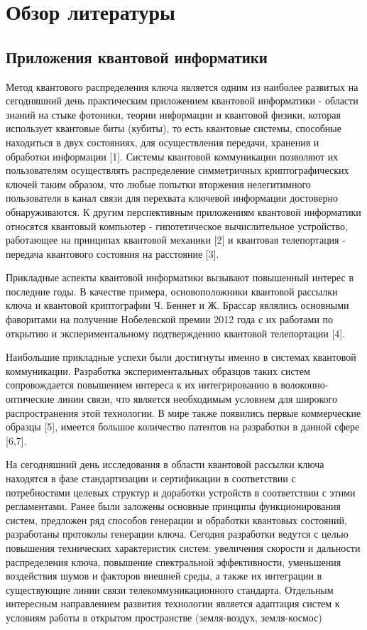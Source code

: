 \chapter{Обзор литературы} \label{ch:ch1}
\section{Приложения квантовой информатики} \label{sec:ch1/sec1}

Метод квантового распределения ключа является одним из наиболее развитых на сегодняшний день практическим приложением квантовой информатики - области знаний на стыке фотоники, теории информации и квантовой физики, которая использует квантовые биты (кубиты), то есть квантовые системы, способные находиться в двух состояниях, для осуществления передачи, хранения и обработки информации [1]. Системы квантовой коммуникации позволяют их пользователям осуществлять распределение симметричных криптографических ключей таким образом, что любые попытки вторжения нелегитимного пользователя в канал связи для перехвата ключевой информации достоверно обнаруживаются. К другим перспективным приложениям квантовой информатики относятся квантовый компьютер - гипотетическое вычислительное устройство, работающее на принципах квантовой механики [2] и квантовая телепортация - передача квантового состояния на расстояние [3].


Прикладные аспекты квантовой информатики вызывают повышенный интерес в последние годы. В качестве примера, основоположники квантовой рассылки ключа и квантовой криптографии Ч. Беннет и Ж. Брассар являлись основными фаворитами на получение Нобелевской премии 2012 года с их работами по открытию и экспериментальному подтверждению квантовой телепортации [4].  


Наибольшие прикладные успехи были достигнуты именно в системах квантовой коммуникации. Разработка экспериментальных образцов таких систем сопровождается повышением интереса к их интегрированию в волоконно-оптические линии связи, что является необходимым условием для широкого распространения этой технологии. В мире также появились первые коммерческие образцы [5], имеется большое количество патентов на разработки в данной сфере [6,7].


На сегодняшний день исследования в области квантовой рассылки ключа находятся в фазе стандартизации и сертификации в соответствии с потребностями целевых структур и доработки устройств в соответствии с этими регламентами. Ранее были заложены основные принципы функционирования систем, предложен ряд способов генерации и обработки квантовых состояний, разработаны протоколы генерации ключа. Сегодня разработки ведутся с целью повышения технических характеристик систем: увеличения скорости и дальности распределения ключа, повышение спектральной эффективности, уменьшения воздействия шумов и факторов внешней среды, а также их интеграции в существующие линии связи телекоммуникационного стандарта. Отдельным интересным направлением развития технологии является адаптация систем к условиям работы в открытом пространстве (земля-воздух, земля-космос)

